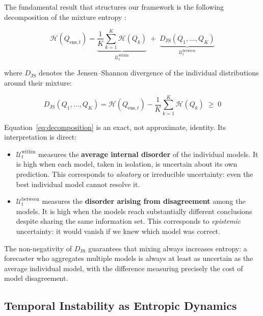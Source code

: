 \documentclass[12pt,a4paper]{article}
\theoremstyle{remark}
\begin{document}
The fundamental result that structures our framework is the following
decomposition of the mixture entropy \citep{haussler1997,heskes1998}:

\begin{equation}
    \mathcal{H}(Q_{\text{ens},t}) = \underbrace{\frac{1}{K}
    \sum_{k=1}^{K} \mathcal{H}(Q_k)}_{\mathcal{U}^{\text{within}}_t}
    \;+\;
    \underbrace{D_{\text{JS}}(Q_1, \ldots, Q_K)}_{\mathcal{U}^{\text{between}}_t}
    \label{eq:decomposition}
\end{equation}

where $D_{\text{JS}}$ denotes the Jensen--Shannon divergence of the
individual distributions around their mixture:

\begin{equation}
    D_{\text{JS}}(Q_1,\ldots,Q_K) = \mathcal{H}(Q_{\text{ens},t})
    - \frac{1}{K}\sum_{k=1}^{K} \mathcal{H}(Q_k) \;\geq\; 0
    \label{eq:jsd}
\end{equation}

Equation~\eqref{eq:decomposition} is an exact, not approximate,
identity. Its interpretation is direct:

\begin{itemize}
    \item $\mathcal{U}^{\text{within}}_t$ measures the \textbf{average
    internal disorder} of the individual models. It is high when each model,
    taken in isolation, is uncertain about its own prediction. This
    corresponds to \emph{aleatory} or irreducible uncertainty: even the
    best individual model cannot resolve it.

    \item $\mathcal{U}^{\text{between}}_t$ measures the \textbf{disorder
    arising from disagreement} among the models. It is high when the models
    reach substantially different conclusions despite sharing the same
    information set. This corresponds to \emph{epistemic} uncertainty: it
    would vanish if we knew which model was correct.
\end{itemize}

The non-negativity of $D_{\text{JS}}$ guarantees that mixing always
increases entropy: a forecaster who aggregates multiple models is always
at least as uncertain as the average individual model, with the difference
measuring precisely the cost of model disagreement.

\subsection{Temporal Instability as Entropic Dynamics}
\end{document}

